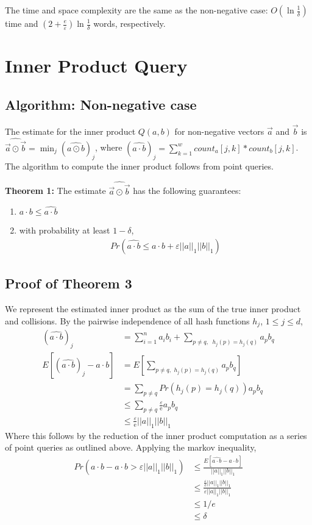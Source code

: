 \documentclass[11pt]{article}
\begin{document}
The time and space complexity are the same as the non-negative case: $O(\ln
\frac{1}{\delta})$ time and $(2 + \frac{e}{\varepsilon})\ln \frac{1}{\delta}$
words, respectively. 

\section{Inner Product Query}
	\subsection{Algorithm: Non-negative case}
		The estimate for the inner product $\mathit{Q}(a,b)$ for non-negative vectors $\vec{a}$ and $\vec{b}$ is $\widehat{\vec{a} \odot \vec{b}} = \min_j(\widehat{a \odot b})_j$, where $(\widehat{a \cdot b})_j = \sum_{k=1}^w count_a[j,k] * count_b[j,k]$. The algorithm to compute the inner product follows from point queries.

        \textbf{Theorem 1:} The estimate $\widehat{\vec{a} \odot \vec{b}}$ has the following guarantees:
        \begin{enumerate}[label=\textnormal{(\arabic*)}]
            \item $a \cdot b \leq \widehat{a \cdot b}$
            \item with probability at least $1 - \delta$, 
            \begin{align}
		        Pr(\widehat{a \cdot b} \leq a \cdot b + \varepsilon||a||_1||b||_1)
            \end{align}
        \end{enumerate}

	\subsection{Proof of Theorem 3}
		We represent the estimated inner product as the sum of the true inner product and collisions. By the pairwise independence of all hash functions $h_j$, $1 \leq j \leq d$,
		\begin{align}
		(\widehat{a \cdot b})_j &= \sum_{i=1}^n a_ib_i + \sum_{p \neq q, \,\,\ h_j(p)=h_j(q)} a_pb_q \\
		E\left[(\widehat{a \cdot b})_j - a \cdot b\right] &= E\left[\sum_{p \neq q, \,\, h_j(p)=h_j(q)} a_pb_q\right] \\
		&= \sum_{p \neq q}Pr(h_j(p) = h_j(q))a_pb_q \\
		&\leq \sum_{p \neq q} \frac{\varepsilon}{\mathrm{e}}a_pb_q \\
		&\leq \frac{\varepsilon}{\mathrm e}||a||_1||b||_1
		\end{align}
		Where this follows by the reduction of the inner product computation as a series of point queries as outlined above. Applying the markov inequality,
		\begin{align}
		Pr(\widehat{a \cdot b} - a \cdot b > \varepsilon ||a||_1||b||_1) &\leq \frac{E[\widehat{a \cdot b} - a \cdot b]}{||a||_1||b||_1} \\
		&\leq \frac{\frac{\varepsilon}{\mathrm e}||a||_1||b||_1}{\varepsilon||a||_1||b||_1} \\
		& \leq 1/e \\
		&\leq \delta
		\end{align}
\end{document}
